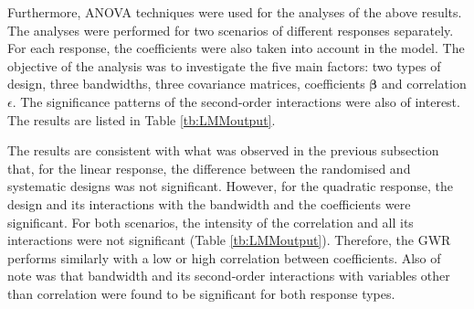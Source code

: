 \documentclass[a4paper]{article} 	%
\begin{document}
Furthermore, ANOVA techniques were used for the analyses of the above results. The analyses were performed for two scenarios of different responses separately. For each response, the coefficients were also taken into account in the model. The objective of the analysis was to investigate the five main factors: two types of design, three bandwidths, three covariance matrices, coefficients $\bm{\beta}$ and correlation $\epsilon$. The significance patterns of the second-order interactions were also of interest. The results are listed in Table \ref{tb:LMMoutput}. 

The results are consistent with what was observed in the previous subsection that, for the linear response, the difference between the randomised and systematic designs was not significant. However, for the quadratic response, the design and its interactions with the bandwidth and the coefficients were significant. For both scenarios, the intensity of the correlation and all its interactions were not significant (Table \ref{tb:LMMoutput}). Therefore, the GWR performs similarly with a low or high correlation between coefficients. Also of note was that bandwidth and its second-order interactions with variables other than correlation were found to be significant for both response types. 
\end{document}
